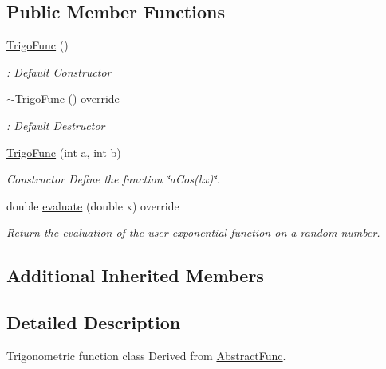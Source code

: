 \subsection*{Public Member Functions}
\begin{DoxyCompactItemize}
\item 
\mbox{\label{classTrigoFunc_ad9c2c47ce62daefcbb8c6c0c9d19e227}} 
\hyperlink{classTrigoFunc_ad9c2c47ce62daefcbb8c6c0c9d19e227}{Trigo\+Func} ()
\begin{DoxyCompactList}\small\item\em \+: Default Constructor \end{DoxyCompactList}\item 
\mbox{\label{classTrigoFunc_ab29276e57f968adfe36184e4b21f0b37}} 
\hyperlink{classTrigoFunc_ab29276e57f968adfe36184e4b21f0b37}{$\sim$\+Trigo\+Func} () override
\begin{DoxyCompactList}\small\item\em \+: Default Destructor \end{DoxyCompactList}\item 
\hyperlink{classTrigoFunc_aee28a8cc4b96ef97e3da805b0d9e624e}{Trigo\+Func} (int a, int b)
\begin{DoxyCompactList}\small\item\em Constructor Define the function \char`\"{}a\+Cos(bx)\char`\"{}. \end{DoxyCompactList}\item 
double \hyperlink{classTrigoFunc_ac04acbf2d2b7301d6e2084c9bb8daab2}{evaluate} (double x) override
\begin{DoxyCompactList}\small\item\em Return the evaluation of the user exponential function on a random number. \end{DoxyCompactList}\end{DoxyCompactItemize}
\subsection*{Additional Inherited Members}


\subsection{Detailed Description}
Trigonometric function class Derived from \hyperlink{classAbstractFunc}{Abstract\+Func}. 

